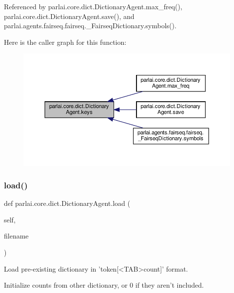 Referenced by parlai.\+core.\+dict.\+Dictionary\+Agent.\+max\+\_\+freq(), parlai.\+core.\+dict.\+Dictionary\+Agent.\+save(), and parlai.\+agents.\+fairseq.\+fairseq.\+\_\+\+Fairseq\+Dictionary.\+symbols().

Here is the caller graph for this function\+:
\nopagebreak
\begin{figure}[H]
\begin{center}
\leavevmode
\includegraphics[width=350pt]{classparlai_1_1core_1_1dict_1_1DictionaryAgent_ad5abcf174648d88f2383cba7a361dd29_icgraph}
\end{center}
\end{figure}
\mbox{\label{classparlai_1_1core_1_1dict_1_1DictionaryAgent_aa4229d1ba17932f588e15067afd9bf42}} 
\subsubsection{\texorpdfstring{load()}{load()}}
{\footnotesize\ttfamily def parlai.\+core.\+dict.\+Dictionary\+Agent.\+load (\begin{DoxyParamCaption}\item[{}]{self,  }\item[{}]{filename }\end{DoxyParamCaption})}

\begin{DoxyVerb}Load pre-existing dictionary in 'token[<TAB>count]' format.

Initialize counts from other dictionary, or 0 if they aren't included.
\end{DoxyVerb}
 

